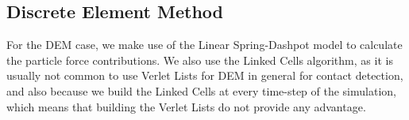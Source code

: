 \documentclass[preprint,12pt]{elsarticle}
\begin{document}
\subsection{Discrete Element Method}

For the \ac{DEM} case, we make use of the Linear Spring-Dashpot model to calculate the particle force contributions.
We also use the Linked Cells algorithm, as it is usually not common to use Verlet Lists for \ac{DEM} in general for contact detection, and also because we build the Linked Cells at every time-step of the simulation, which means that building the Verlet Lists do not provide any advantage.

%

\end{document}
